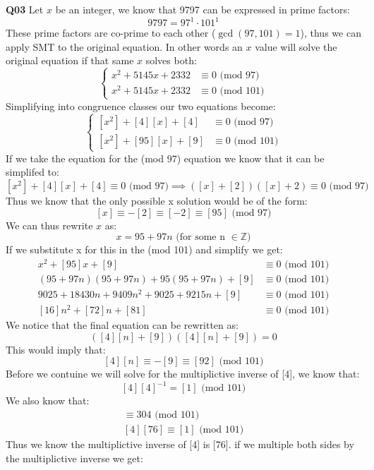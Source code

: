 \documentclass[11pt]{article}
\begin{document}
\parindent=0pt

\textbf{Q03} Let $x$ be an integer, we know that 9797 can be expressed in prime factors:
\[ 9797 = 97^{1} \cdot 101^{1} \]
These prime factors are co-prime to each other ($\gcd(97,101) =1$), thus we can apply SMT to the original equation. In other words an $x$ value will solve the original equation if that same $x$ solves both:
$$
\begin{cases}
x^2 + 5145x + 2332 & \equiv 0 \text{  (mod 97)} \\
x^2+ 5145x + 2332 & \equiv 0        \text{  (mod 101)}
\end{cases}
$$
Simplifying into congruence classes our two equations become:
$$
\begin{cases}
[x^2] + [4][x] + [4] & \equiv 0 \text{  (mod 97)} \\
[x^2] + [95][x] + [9] & \equiv 0        \text{  (mod 101)}
\end{cases}
$$
If we take the equation for the (mod 97) equation we know that it can be simplifed to:
\[ [x^2] + [4][x] + [4] \equiv 0 \text{  (mod 97)}  \implies ([x] + [2])([x] + 2)  \equiv 0 \text{  (mod 97)} \]
Thus we know that the only possible x solution would be of the form:
\[ [x] \equiv - [2]  \equiv [-2]  \equiv [95]  \text{  (mod 97)} \]
We can thus rewrite $x$ as:
\[ x = 95 + 97n  \text {  (for some n $\in \mathbb{Z}$)} \]
If we substitute x for this in the (mod 101) and simplify we get:
\begin{align*}
  x^2+ [95]x + [9] & \equiv 0        \text{  (mod 101)} \\
 (95 + 97n)(95 + 97n) + 95(95 + 97n) + [9] & \equiv 0   \text{  (mod 101)} \\
9025 + 18430n + 9409n^2 + 9025 + 9215n + [9] & \equiv 0   \text{  (mod 101)} \\
[16]n^2 + [72]n + [81] & \equiv 0   \text{  (mod 101)} 
\end{align*}
We notice that the final equation can be rewritten as:
\[ ([4][n] + [9])([4][n] + [9]) = 0 \]
This would imply that:
\[ [4][n] \equiv - [9] \equiv [92]  \text{  (mod 101)} \]
Before we contuine we will solve for the multiplictive inverse of [4], we know that:
\[ [4][4]^{-1} = [1]  \text{  (mod 101)}  \]
We also know that:
\begin{align*}
  [4][76] \equiv 304 \text{  (mod 101)} \\
  [4][76] \equiv [1] \text{  (mod 101)} 
\end{align*}
Thus we know the multiplictive inverse of [4] is [76]. if we multiple both sides by the multiplictive inverse we get:
\end{document}
